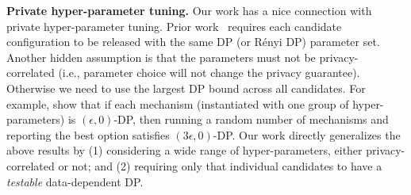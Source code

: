 
\textbf{Private hyper-parameter tuning.}
Our work has a nice connection with private hyper-parameter tuning. 
Prior work~\citep{liu2019private, papernot2021hyperparameter} requires each candidate configuration to be released with the same DP (or R\'enyi DP) parameter set. Another hidden assumption is that the parameters must not be privacy-correlated
(i.e., parameter choice will not change the privacy guarantee). Otherwise we need to use the largest DP bound across all candidates.
For example, \citet{liu2019private} show that if each mechanism (instantiated with  one group of hyper-parameters) is $(\epsilon, 0)$-DP, then running a random number of mechanisms and reporting the best option satisfies $(3\epsilon, 0)$-DP. 
Our work directly generalizes the above results by (1) considering a wide range of hyper-parameters, either privacy-correlated or not; and (2) requiring only that individual candidates to have a \emph{testable} data-dependent DP.







